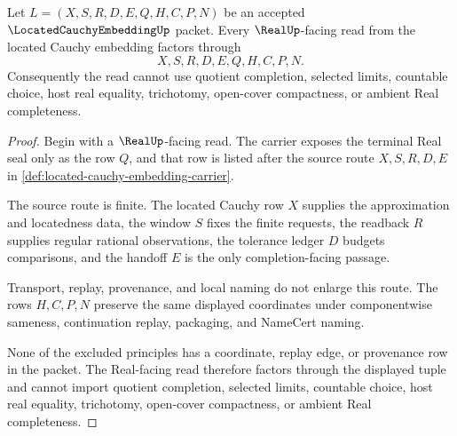 \begin{theorem}
\label{thm:located-cauchy-embedding-real-seal-handoff}
Let $L=(X,S,R,D,E,Q,H,C,P,N)$ be an accepted $\LocatedCauchyEmbeddingUp$ packet. Every $\RealUp$-facing read from the located Cauchy embedding factors through
$$
X,S,R,D,E,Q,H,C,P,N .
$$
Consequently the read cannot use quotient completion, selected limits, countable choice, host real equality, trichotomy, open-cover compactness, or ambient Real completeness.
\end{theorem}
\begin{proof}
Begin with a $\RealUp$-facing read. The carrier exposes the terminal Real seal only as the row $Q$, and that row is listed after the source route $X,S,R,D,E$ in \autoref{def:located-cauchy-embedding-carrier}.

The source route is finite. The located Cauchy row $X$ supplies the approximation and locatedness data, the window $S$ fixes the finite requests, the readback $R$ supplies regular rational observations, the tolerance ledger $D$ budgets comparisons, and the handoff $E$ is the only completion-facing passage.

Transport, replay, provenance, and local naming do not enlarge this route. The rows $H,C,P,N$ preserve the same displayed coordinates under componentwise sameness, continuation replay, packaging, and NameCert naming.

None of the excluded principles has a coordinate, replay edge, or provenance row in the packet. The Real-facing read therefore factors through the displayed tuple and cannot import quotient completion, selected limits, countable choice, host real equality, trichotomy, open-cover compactness, or ambient Real completeness.
\end{proof}


